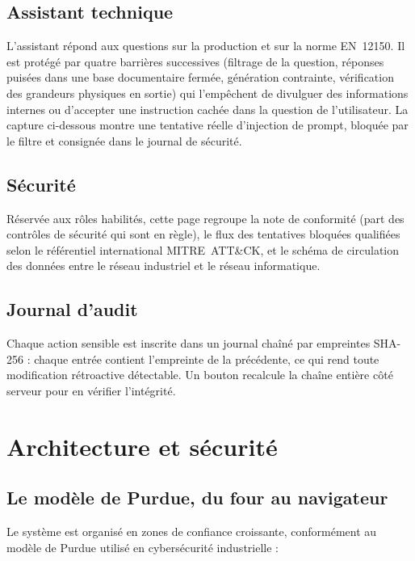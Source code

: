\documentclass[11pt,a4paper]{report}
\begin{document}
\section{Assistant technique}
L'assistant répond aux questions sur la production et sur la norme EN~12150. Il
est protégé par quatre barrières successives (filtrage de la question, réponses
puisées dans une base documentaire fermée, génération contrainte, vérification
des grandeurs physiques en sortie) qui l'empêchent de divulguer des informations
internes ou d'accepter une instruction cachée dans la question de l'utilisateur.
La capture ci-dessous montre une tentative réelle d'injection de prompt,
bloquée par le filtre et consignée dans le journal de sécurité.


\section{Sécurité}
Réservée aux rôles habilités, cette page regroupe la note de conformité (part
des contrôles de sécurité qui sont en règle), le flux des tentatives bloquées
qualifiées selon le référentiel international MITRE~ATT\&CK, et le schéma de
circulation des données entre le réseau industriel et le réseau informatique.


\section{Journal d'audit}
Chaque action sensible est inscrite dans un journal chaîné par empreintes
SHA-256 : chaque entrée contient l'empreinte de la précédente, ce qui rend toute
modification rétroactive détectable. Un bouton recalcule la chaîne entière côté
serveur pour en vérifier l'intégrité.


\chapter{Architecture et sécurité}

\section{Le modèle de Purdue, du four au navigateur}
Le système est organisé en zones de confiance croissante, conformément au
modèle de Purdue utilisé en cybersécurité industrielle :
\end{document}
